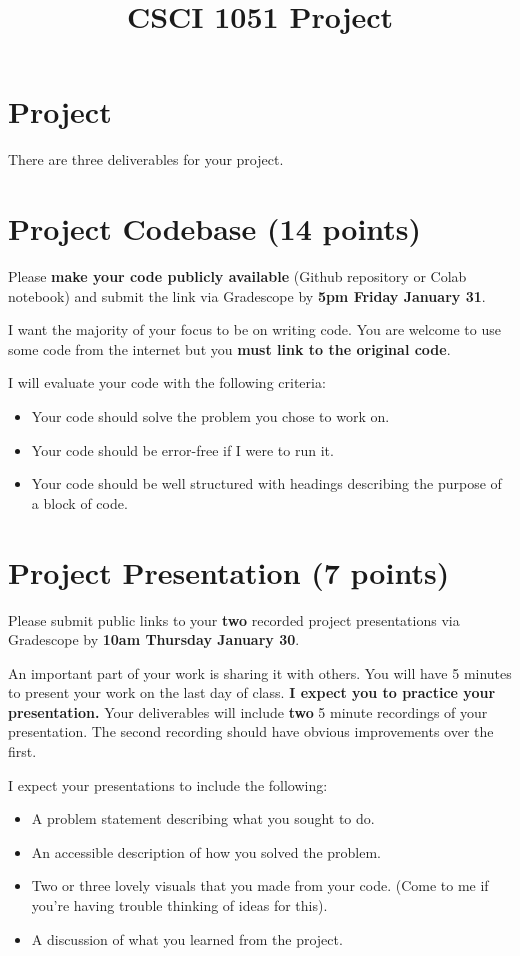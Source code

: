 \documentclass{article}
\title{CSCI 1051 Project}
\date{}
\begin{document}
\maketitle

\section*{Project}

There are three deliverables for your project.

\section{Project Codebase (14 points)}
Please \textbf{make your code publicly available} (Github repository
or Colab notebook) and submit the link via Gradescope by
\textbf{5pm Friday January 31}.

I want the majority of your focus to be on writing code.
You are welcome to use some code from the internet but you
\textbf{must link to the original code}.

I will evaluate your code with the following criteria:
\begin{itemize}
    \item Your code should solve the problem you chose to work on.
    \item Your code should be error-free if I were to run it.
    \item Your code should be well structured with headings describing 
    the purpose of a block of code.
\end{itemize}

\section{Project Presentation (7 points)}
Please submit public links to your \textbf{two} recorded
project presentations via Gradescope by \textbf{10am Thursday January 30}.

An important part of your work is sharing it with others.
You will have 5 minutes to present your work on the last day of class.
\textbf{I expect you to practice your presentation.}
Your deliverables will include \textbf{two} 5 minute recordings of your presentation.
The second recording should have obvious improvements over the first.

I expect your presentations to include the following:
\begin{itemize}
    \item A problem statement describing what you sought to do.
    \item An accessible description of how you solved the problem.
    \item Two or three lovely visuals that you made from your code.
    (Come to me if you're having trouble thinking of ideas for this).
    \item A discussion of what you learned from the project.
\end{itemize}
\end{document}
